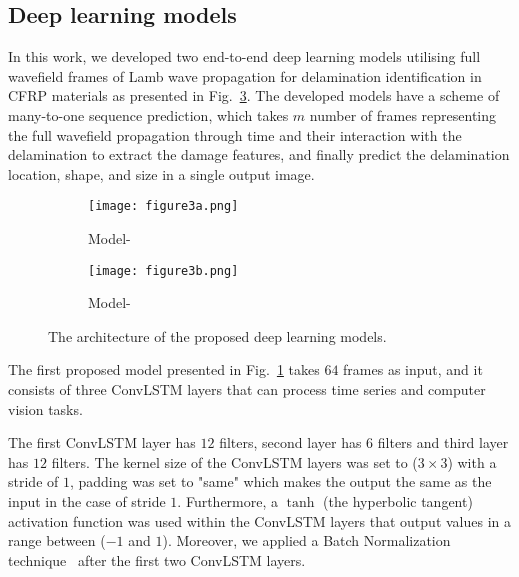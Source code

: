 \subsection{Deep learning models}
\label{proposed_approach}
In this work, we developed two end-to-end deep learning models utilising full wavefield frames of Lamb wave propagation for delamination identification in CFRP materials as presented in Fig.~\ref{fig:proposed_models}.
The developed models have a scheme of many-to-one sequence prediction, which takes \(m\) number of frames representing the full wavefield propagation through time and their interaction with the delamination to extract the damage features, and finally predict the delamination location, shape, and size in a single output image.
\begin{figure} [!h]
	\centering
	\begin{subfigure}[b]{0.49\textwidth}
		\centering
		\texttt{[image: figure3a.png]}
		\caption{Model-} %
		\label{fig:convlstm_model}
	\end{subfigure}
	\hfill
	\begin{subfigure}[b]{0.49\textwidth}
		\centering
		\texttt{[image: figure3b.png]}
		\caption{Model-} %
		\label{fig:AE_convlstm}
	\end{subfigure}
	\caption{The architecture of the proposed deep learning models.}
	\label{fig:proposed_models}
\end{figure} 

The first proposed model presented in Fig.~\ref{fig:convlstm_model} takes \(64\) frames as input, and it consists of three ConvLSTM layers that can process time series and computer vision tasks.

The first ConvLSTM layer has \(12\) filters, second layer has \(6\) filters and third layer has \(12\) filters.
The kernel size of the ConvLSTM layers was set to (\(3\times3\)) with a stride of \(1\), padding was set to "same" which makes the output the same as the input in the case of stride \(1\).
Furthermore, a \(\tanh\) (the hyperbolic tangent) activation function was used within the ConvLSTM layers that output values in a range between (\(-1\) and \(1\)).
Moreover, we applied a Batch Normalization technique~\cite{Santurkar2018} after the first two ConvLSTM layers.  


